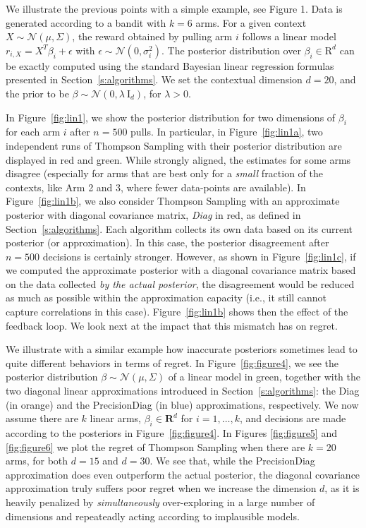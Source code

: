 \documentclass{article} \usepackage{iclr2018_conference,times}
\begin{document}
We illustrate the previous points with a simple example, see Figure 1.
Data is generated according to a bandit with $k = 6$ arms.
For a given context $X \sim \mathcal{N}(\mu, \Sigma)$, the reward obtained by pulling arm $i$ follows a linear model $r_{i, X} = X^T \beta_i + \epsilon$ with $\epsilon \sim \mathcal{N}(0, \sigma_i^2)$.
The posterior distribution over $\beta_i \in \mathrm{R}^d$ can be exactly computed using the standard Bayesian linear regression formulas presented in Section~\ref{s:algorithms}.
We set the contextual dimension $d = 20$, and the prior to be $\beta \sim \mathcal{N}(0, \lambda \ \text{I}_d)$, for  $\lambda > 0$.

In Figure~\ref{fig:lin1}, we show the posterior distribution for two dimensions of $\beta_i$ for each arm $i$ after $n = 500$ pulls.
In particular, in Figure~\ref{fig:lin1a}, two independent runs of Thompson Sampling with their posterior distribution are displayed in red and green.
While strongly aligned, the estimates for some arms disagree (especially for arms that are best only for a \emph{small} fraction of the contexts, like Arm 2 and 3, where fewer data-points are available).
In Figure~\ref{fig:lin1b}, we also consider Thompson Sampling with an approximate posterior with diagonal covariance matrix, \emph{Diag} in red, as defined in Section~\ref{s:algorithms}.
Each algorithm collects its own data based on its current posterior (or approximation).
In this case, the posterior disagreement after $n = 500$ decisions is certainly stronger.
However, as shown in Figure~\ref{fig:lin1c}, if we computed the approximate posterior with a diagonal covariance matrix based on the data collected \emph{by the actual posterior}, the disagreement would be reduced as much as possible within the approximation capacity (i.e., it still cannot capture correlations in this case).
Figure~\ref{fig:lin1b} shows then the effect of the feedback loop.
We look next at the impact that this mismatch has on regret.



We illustrate with a similar example how inaccurate posteriors sometimes lead to quite different behaviors in terms of regret.
In Figure~\ref{fig:figure4}, we see the posterior distribution $\beta \sim \mathcal{N}(\mu, \Sigma)$ of a linear model in green, together with the two diagonal linear approximations introduced in Section~\ref{s:algorithms}: the Diag (in orange) and the PrecisionDiag (in blue) approximations, respectively.
We now assume there are $k$ linear arms, $\beta_i \in \mathbf{R}^d$ for $i=1, \dots, k$, and decisions are made according to the posteriors in Figure~\ref{fig:figure4}.
In Figures \ref{fig:figure5} and \ref{fig:figure6} we plot the regret of Thompson Sampling when there are $k=20$ arms, for both $d=15$ and $d=30$.
We see that, while the PrecisionDiag approximation does even outperform the actual posterior, the diagonal covariance approximation truly suffers poor regret when we increase the dimension $d$, as it is heavily penalized by \emph{simultaneously} over-exploring in a large number of dimensions and repeateadly acting according to implausible models.
\end{document}

